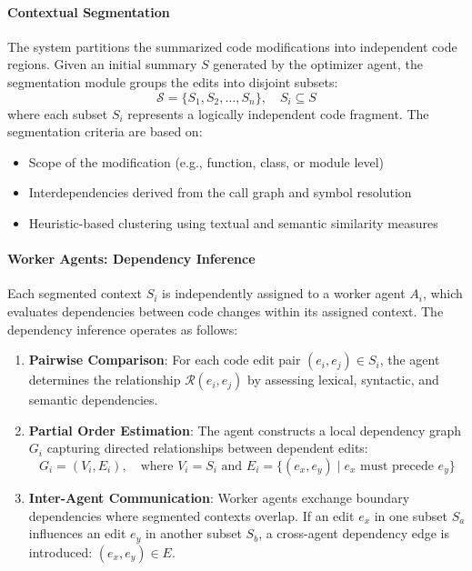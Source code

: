 \paragraph{Contextual Segmentation}
The system partitions the summarized code modifications into independent code regions. Given an initial summary \( S \) generated by the optimizer agent, the segmentation module groups the edits into disjoint subsets:
\[
\mathcal{S} = \{ S_1, S_2, \dots, S_n \}, \quad S_i \subseteq S
\]
where each subset \( S_i \) represents a logically independent code fragment. The segmentation criteria are based on:
\begin{itemize}
    \item Scope of the modification (e.g., function, class, or module level)
    \item Interdependencies derived from the call graph and symbol resolution
    \item Heuristic-based clustering using textual and semantic similarity measures
\end{itemize}

\paragraph{Worker Agents: Dependency Inference}
Each segmented context \( S_i \) is independently assigned to a worker agent \( A_i \), which evaluates dependencies between code changes within its assigned context. The dependency inference operates as follows:

\begin{enumerate}
    \item \textbf{Pairwise Comparison}: For each code edit pair \( (e_i, e_j) \in S_i \), the agent determines the relationship \( \mathcal{R}(e_i, e_j) \) by assessing lexical, syntactic, and semantic dependencies.
    \item \textbf{Partial Order Estimation}: The agent constructs a local dependency graph \( G_i \) capturing directed relationships between dependent edits:
    \[
    G_i = (V_i, E_i), \quad \text{where } V_i = S_i \text{ and } E_i = \{ (e_x, e_y) \mid e_x \text{ must precede } e_y \}
    \]
    \item \textbf{Inter-Agent Communication}: Worker agents exchange boundary dependencies where segmented contexts overlap. If an edit \( e_x \) in one subset \( S_a \) influences an edit \( e_y \) in another subset \( S_b \), a cross-agent dependency edge is introduced: \( (e_x, e_y) \in E \).
\end{enumerate}

